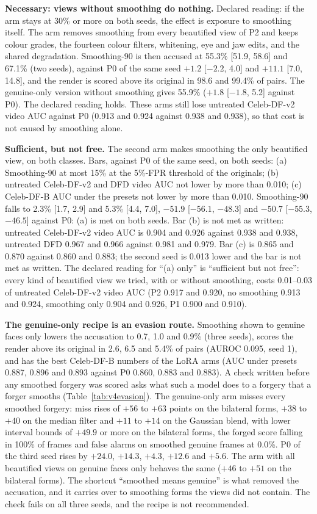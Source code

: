\documentclass[10pt]{article}
\begin{document}
\textbf{Necessary: views without smoothing do nothing.} Declared reading: if the arm stays at 30\% or more on both
seeds, the effect is exposure to smoothing itself. The arm removes smoothing from every beautified view of P2 and keeps
colour grades, the fourteen colour filters, whitening, eye and jaw edits, and the shared degradation. Smoothing-90 is
then accused at 55.3\% [51.9, 58.6] and 67.1\% (two seeds), against P0 of the same seed $+1.2$ [$-2.2$, 4.0] and $+11.1$
[7.0, 14.8], and the render is scored above its original in 98.6 and 99.4\% of pairs. The genuine-only version without
smoothing gives 55.9\% ($+1.8$ [$-1.8$, 5.2] against P0). The declared reading holds. These arms still lose untreated
Celeb-DF-v2 video AUC against P0 (0.913 and 0.924 against 0.938 and 0.938), so that cost is not caused by smoothing
alone.

\textbf{Sufficient, but not free.} The second arm makes smoothing the only beautified view, on both classes. Bars,
against P0 of the same seed, on both seeds: (a) Smoothing-90 at most 15\% at the 5\%-FPR threshold of the originals;
(b) untreated Celeb-DF-v2 and DFD video AUC not lower by more than 0.010; (c) Celeb-DF-B AUC under the presets not
lower by more than 0.010. Smoothing-90 falls to 2.3\% [1.7, 2.9] and
5.3\% [4.4, 7.0], $-51.9$ [$-56.1$, $-48.3$] and $-50.7$ [$-55.3$, $-46.5$] against P0: (a) is met on both seeds. Bar
(b) is not met as written: untreated Celeb-DF-v2 video AUC is 0.904 and 0.926 against 0.938 and 0.938, untreated DFD
0.967 and 0.966 against 0.981 and 0.979. Bar (c) is 0.865 and 0.870 against 0.860 and 0.883; the second seed is 0.013
lower and the bar is not met as written. The declared reading for ``(a) only'' is ``sufficient but not free'': every
kind of beautified view we tried, with or without smoothing, costs 0.01--0.03 of untreated Celeb-DF-v2 video AUC (P2
0.917 and 0.920, no smoothing 0.913 and 0.924, smoothing only 0.904 and 0.926, P1 0.900 and 0.910).

\textbf{The genuine-only recipe is an evasion route.} Smoothing shown to genuine faces only lowers the accusation to
0.7, 1.0 and 0.9\% (three seeds), scores the render above its original in 2.6, 6.5 and 5.4\% of pairs (AUROC 0.095, seed
1), and has the best Celeb-DF-B numbers of the LoRA arms (AUC under presets 0.887, 0.896 and 0.893 against P0 0.860,
0.883 and 0.883). A check written before any smoothed forgery was scored asks what such a model does to a forgery that
a forger smooths (Table~\ref{tab:v4evasion}). The genuine-only arm misses every smoothed forgery: miss rises of $+56$ to
$+63$ points on the bilateral forms, $+38$ to $+40$ on the median filter and $+11$ to $+14$ on the Gaussian blend, with
lower interval bounds of $+49.9$ or more on the bilateral forms, the forged score falling in 100\% of frames and false
alarms on smoothed genuine frames at 0.0\%. P0 of the third seed rises by $+24.0$, $+14.3$, $+4.3$, $+12.6$ and $+5.6$.
The arm with all beautified views on genuine faces only behaves the same ($+46$ to $+51$ on the bilateral forms). The
shortcut ``smoothed means genuine'' is what removed the accusation, and it carries over to smoothing forms the views
did not contain. The check fails on all three seeds, and the recipe is not recommended.
\end{document}
